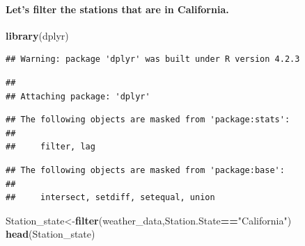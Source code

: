 \documentclass[
]{article}
\newenvironment{Shaded}{\begin{snugshade}}{\end{snugshade}}
\newcommand{\KeywordTok}[1]{\textcolor[rgb]{0.13,0.29,0.53}{\textbf{#1}}}
\newcommand{\NormalTok}[1]{#1}
\newcommand{\OperatorTok}[1]{\textcolor[rgb]{0.81,0.36,0.00}{\textbf{#1}}}
\newcommand{\StringTok}[1]{\textcolor[rgb]{0.31,0.60,0.02}{#1}}
\let\oldparagraph\paragraph
\renewcommand{\paragraph}[1]{\oldparagraph{#1}\mbox{}}
\begin{document}
\hypertarget{lets-filter-the-stations-that-are-in-california.}{%
\paragraph{Let's filter the stations that are in
California.}\label{lets-filter-the-stations-that-are-in-california.}}

\begin{Shaded}
\begin{Highlighting}[]
\KeywordTok{library}\NormalTok{(dplyr)}
\end{Highlighting}
\end{Shaded}

\begin{verbatim}
## Warning: package 'dplyr' was built under R version 4.2.3
\end{verbatim}

\begin{verbatim}
## 
## Attaching package: 'dplyr'
\end{verbatim}

\begin{verbatim}
## The following objects are masked from 'package:stats':
## 
##     filter, lag
\end{verbatim}

\begin{verbatim}
## The following objects are masked from 'package:base':
## 
##     intersect, setdiff, setequal, union
\end{verbatim}

\begin{Shaded}
\begin{Highlighting}[]
\NormalTok{Station_state<-}\KeywordTok{filter}\NormalTok{(weather_data,Station.State}\OperatorTok{==}\StringTok{"California"}\NormalTok{)}
\KeywordTok{head}\NormalTok{(Station_state)}
\end{Highlighting}
\end{Shaded}
\end{document}
